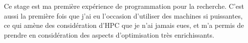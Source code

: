\documentclass[11pts,french]{article}
\begin{document}
Ce stage est ma première expérience de programmation pour la recherche. C'est aussi la première fois que j'ai eu l'occasion d'utiliser des machines si puissantes, ce qui amène des considération d'HPC que je n'ai jamais eues, et m'a permis de prendre en considération des aspects d'optimisation très enrichissants.

\vfill


\end{document}
